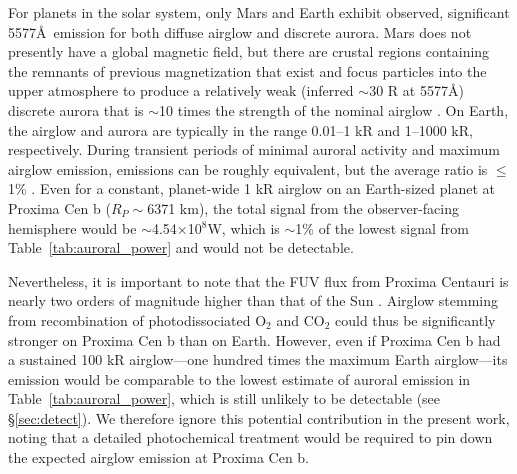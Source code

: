 \documentclass{emulateapj}
\newcommand{\XXX}[1]{#1}      %
\begin{document}
\XXX{For planets in the solar system, only Mars and Earth exhibit observed, significant 5577\AA\ emission for both diffuse airglow and discrete aurora. Mars does not presently have a global magnetic field, but there are crustal regions containing the remnants of previous magnetization that exist and focus particles into the upper atmosphere to produce a relatively weak (inferred $\sim$30 R at 5577\AA) discrete aurora that is $\sim$10 times the strength of the nominal airglow \citep[e.g.][]{Acuna2001,Bertaux2005,Lilensten2015}. On Earth, the airglow and aurora are typically in the range  0.01--1 kR and 1--1000 kR, respectively. During transient periods of minimal auroral activity and maximum airglow emission, emissions can be roughly equivalent, but the average ratio is $\leq$1\%  \citep[e.g.][]{Chamberlain1961,Greer1986}. Even for a constant, planet-wide 1 kR airglow on an Earth-sized planet at Proxima Cen b ($R_P\sim$6371 km), the total signal from the observer-facing hemisphere would be $\sim$4.54$\times$10$^8$W, which is $\sim$1\% of the lowest signal from Table~\ref{tab:auroral_power} and would not be detectable.}

\XXX{Nevertheless, it is important to note that the FUV flux from Proxima Centauri is nearly two orders of magnitude higher than that of the Sun \citep{Meadows2016}. Airglow stemming from recombination of photodissociated O$_2$ and CO$_2$ could thus be significantly stronger on Proxima Cen b than on Earth. However, even if Proxima Cen b had a sustained 100 kR airglow---one hundred times the maximum Earth airglow---its emission would be comparable to the lowest estimate of auroral emission in Table~\ref{tab:auroral_power}, which is still unlikely to be detectable (see \S\ref{sec:detect}). We therefore ignore this potential contribution in the present work, noting that a detailed photochemical treatment would be required to pin down the expected airglow emission at Proxima Cen b.}
\end{document}
